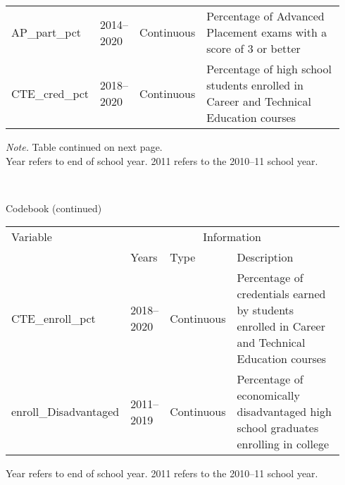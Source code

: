 \begin{threeparttable}
\begin{tabular}{ p{0.2\linewidth} p{0.115\linewidth} p{0.13\linewidth} p{0.49\linewidth}}
AP\_part\_pct                        &   2014--2020     &  Continuous  &  Percentage of Advanced Placement exams with a score of 3 or better              \\ 
CTE\_cred\_pct                       &   2018--2020     &  Continuous  &  Percentage of high school students enrolled in Career and Technical Education courses              \\ 
\midrule
\end{tabular}
\begin{tablenotes}
    { 
        \textit{Note.} Table continued on next page.\\
        \small
         Year refers to end of school year. 2011 refers to the 2010--11 school year. 
    
     }
\end{tablenotes}
\end{threeparttable}
\\
\begin{threeparttable}
    \renewcommand\thetable{1}
    \caption{Codebook (continued)} %
\label{tab:codebook2} %
    \begin{tabular}{ p{0.2\linewidth} p{0.115\linewidth} p{0.13\linewidth} p{0.49\linewidth}}     %
    \toprule %
    Variable                        & \multicolumn{3}{c}{Information} \\ %

                       \cmidrule(r){2-4} %
                                    &   Years    &    Type     &  Description \\ 
\midrule
CTE\_enroll\_pct                     &   2018--2020     &  Continuous  &  Percentage of credentials earned by students enrolled in Career and Technical Education courses              \\ 
enroll\_Disadvantaged                &   2011--2019     &  Continuous  &  Percentage of economically disadvantaged high school graduates enrolling in college             \\ 
\midrule
\end{tabular}
\begin{tablenotes}
    {\small
         Year refers to end of school year. 2011 refers to the 2010--11 school year. 
    
     }
\end{tablenotes}
\end{threeparttable}